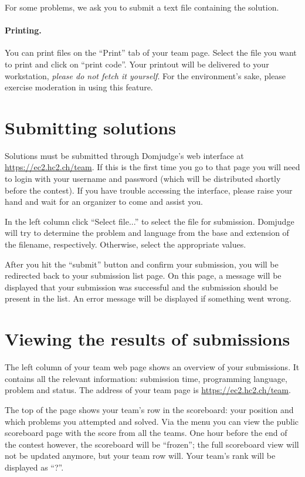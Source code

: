 For some problems, we ask you to submit a text file containing the solution.

\paragraph{Printing.}
You can print files on the ``Print'' tab of your team page.
Select the file you want to print and click on ``print code''.
Your printout will be delivered to your workstation,
\emph{please do not fetch it yourself}. For the
environment's sake, please exercise moderation in
using this feature.


\clearpage
\section{Submitting solutions}
\label{sec:submit}
Solutions must be submitted through Domjudge's web interface
at \url{https://ec2.hc2.ch/team}.
If this is the first time you go to that page
you will need to login with your username and password (which will be
distributed shortly before the contest). If you have trouble accessing
the interface, please raise your hand and wait for an organizer to come
and assist you.

In the left column click ``Select file...'' to select the
file for submission. Domjudge will try to determine the
problem and language from the base and extension of the filename,
respectively. Otherwise, select the appropriate values.

After you hit the ``submit'' button and confirm your submission,
you will be redirected back to your submission list page. On this
page, a message will be displayed that your submission was
successful and the submission should be present in the list.
An error message will be displayed if something went wrong.

\section{Viewing the results of submissions}
The left column of your team web page shows an overview of
your submissions. It contains all the relevant
information: submission time, programming language, problem
and status. The address of your team page is
\url{https://ec2.hc2.ch/team}.

The top of the page shows your team's row in the scoreboard:
your position and which problems you attempted and solved.
Via the menu you can view the public scoreboard page with
the score from all the teams. One hour before the end of
the contest however, the scoreboard will be ``frozen'';
the full scoreboard view will not be updated anymore, but your
team row will. Your team's rank will be displayed as ``?''.

